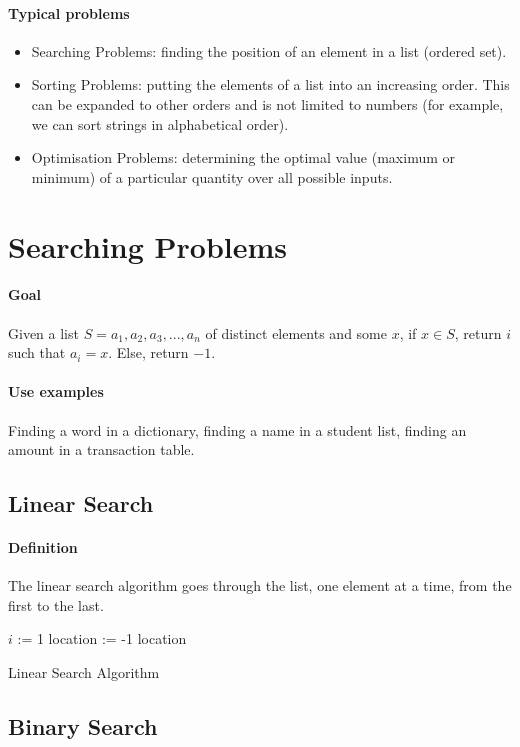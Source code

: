 \documentclass[10pt,a4paper]{book}
\begin{document}
\paragraph*{Typical problems}
\begin{itemize}
\item Searching Problems: finding the position of an element in a list (ordered set).
\item Sorting Problems: putting the elements of a list into an increasing order. This can be expanded to other orders and is not limited to numbers (for example, we can sort strings in alphabetical order).
\item Optimisation Problems: determining the optimal value (maximum or minimum) of a particular quantity over all possible inputs. 
\end{itemize}

\section{Searching Problems}
\paragraph*{Goal}
Given a list $S = a_{1},a_{2},a_{3},...,a_{n}$ of distinct elements and some $x$, if $x \in S$, return $i$ such that $a_{i} = x$. Else, return $-1$.
\paragraph*{Use examples}
Finding a word in a dictionary, finding a name in a student list, finding an amount in a transaction table.

\subsection{Linear Search}
\paragraph*{Definition}
The linear search algorithm goes through the list, one element at a time, from the first to the last.
\begin{algorithm}
\DontPrintSemicolon
\SetAlgoNoEnd
$i$ := 1\;
location := -1\;
\KwRet location
\caption{Linear Search Algorithm}
\end{algorithm}

\subsection{Binary Search}
\end{document}

